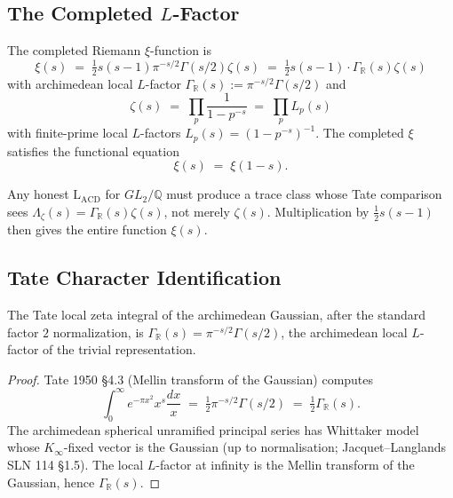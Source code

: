 \subsection{The Completed \(L\)-Factor}

The completed Riemann \(\xi\)-function is
\begin{equation}
\label{v4-arith:lacd:eq:xi-def}
\xi(s) \;=\; \tfrac{1}{2}s(s-1)\pi^{-s/2}\Gamma(s/2)\zeta(s) \;=\; \tfrac{1}{2}s(s-1)\cdot\Gamma_{\mathbb{R}}(s)\zeta(s)
\end{equation}
with archimedean local \(L\)-factor
\(\Gamma_{\mathbb{R}}(s) := \pi^{-s/2}\Gamma(s/2)\) and
\begin{equation}
\zeta(s) \;=\; \prod_{p}\frac{1}{1 - p^{-s}} \;=\; \prod_{p}L_{p}(s)
\end{equation}
with finite-prime local \(L\)-factors
\(L_{p}(s) = (1 - p^{-s})^{-1}\). The completed \(\xi\) satisfies the
functional equation
\begin{equation}
\label{v4-arith:lacd:eq:fe}
\xi(s) \;=\; \xi(1 - s).
\end{equation}

Any honest \(\mathrm{L}_{\mathrm{ACD}}\) for \(GL_{2}/\mathbb{Q}\) must
produce a trace class whose Tate comparison sees
\(\Lambda_{\zeta}(s)=\Gamma_{\mathbb R}(s)\zeta(s)\), not merely
\(\zeta(s)\). Multiplication by \(\tfrac12 s(s-1)\) then gives the
entire function \(\xi(s)\).

\subsection{Tate Character Identification}

\begin{proposition}[archimedean character \(=\Gamma_{\mathbb{R}}\)]
\label{v4-arith:lacd:prop:arch-character}
The Tate local zeta integral of the
archimedean Gaussian, after the standard factor \(2\) normalization, is
\(\Gamma_{\mathbb{R}}(s) = \pi^{-s/2}\Gamma(s/2)\), the archimedean
local \(L\)-factor of the trivial representation.
\end{proposition}

\begin{proof}
Tate 1950 \S4.3 (Mellin transform of the Gaussian) computes
\begin{equation}
\int_{0}^{\infty}e^{-\pi x^{2}}x^{s}\frac{dx}{x} \;=\; \tfrac{1}{2}\pi^{-s/2}\Gamma(s/2) \;=\; \tfrac{1}{2}\Gamma_{\mathbb{R}}(s).
\end{equation}
The archimedean spherical unramified principal series has Whittaker
model whose \(K_{\infty}\)-fixed vector is the Gaussian (up to
normalisation; Jacquet--Langlands SLN 114 \S1.5). The local
\(L\)-factor at infinity is the Mellin transform of the Gaussian,
hence \(\Gamma_{\mathbb{R}}(s)\).
\end{proof}

